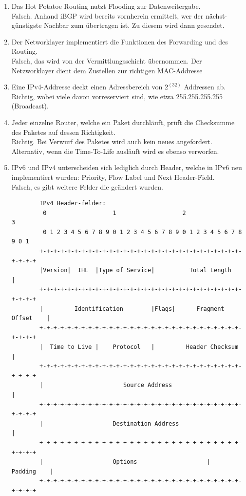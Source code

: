 \documentclass{scrartcl}
\begin{document}
\begin{enumerate}
        \item Das Hot Potatoe Routing nutzt Flooding zur Datenweitergabe.\\
        Falsch. Anhand iBGP wird bereits vornherein ermittelt, wer der nächst-günstigste Nachbar zum übertragen ist. Zu diesem wird dann gesendet.
        
        \item Der Networklayer implementiert die Funktionen des Forwarding und des Routing.\\
        Falsch, das wird von der Vermittlungsschicht übernommen. Der Netzworklayer dient dem Zustellen zur richtigen MAC-Addresse
        
        
        \item Eine IPv4-Addresse deckt einen Adressbereich von $2^(32)$ Addressen ab.\\
        Richtig, wobei viele davon vorreserviert sind, wie etwa 255.255.255.255 (Broadcast). 
        
        \item Jeder einzelne Router, welche ein Paket durchläuft, prüft die Checksumme des Paketes auf dessen Richtigkeit.\\
        Richtig. Bei Verwurf des Paketes wird auch kein neues angefordert.
        Alternativ, wenn die Time-To-Life ausläuft wird es ebenso verworfen.
        
        \item IPv6 und IPv4 unterscheiden sich lediglich durch Header, welche in IPv6 neu implementiert wurden: Priority, Flow Label und Next Header-Field.\\
        Falsch, es gibt weitere Felder die geändert wurden.
        
        \begin{verbatim}
        IPv4 Header-felder:
         0                   1                   2                   3
         0 1 2 3 4 5 6 7 8 9 0 1 2 3 4 5 6 7 8 9 0 1 2 3 4 5 6 7 8 9 0 1
        +-+-+-+-+-+-+-+-+-+-+-+-+-+-+-+-+-+-+-+-+-+-+-+-+-+-+-+-+-+-+-+-+
        |Version|  IHL  |Type of Service|          Total Length         |
        +-+-+-+-+-+-+-+-+-+-+-+-+-+-+-+-+-+-+-+-+-+-+-+-+-+-+-+-+-+-+-+-+
        |         Identification        |Flags|      Fragment Offset    |
        +-+-+-+-+-+-+-+-+-+-+-+-+-+-+-+-+-+-+-+-+-+-+-+-+-+-+-+-+-+-+-+-+
        |  Time to Live |    Protocol   |         Header Checksum       |
        +-+-+-+-+-+-+-+-+-+-+-+-+-+-+-+-+-+-+-+-+-+-+-+-+-+-+-+-+-+-+-+-+
        |                       Source Address                          |
        +-+-+-+-+-+-+-+-+-+-+-+-+-+-+-+-+-+-+-+-+-+-+-+-+-+-+-+-+-+-+-+-+
        |                    Destination Address                        |
        +-+-+-+-+-+-+-+-+-+-+-+-+-+-+-+-+-+-+-+-+-+-+-+-+-+-+-+-+-+-+-+-+
        |                    Options                    |    Padding    |
        +-+-+-+-+-+-+-+-+-+-+-+-+-+-+-+-+-+-+-+-+-+-+-+-+-+-+-+-+-+-+-+-+
        \end{verbatim}
        

\end{enumerate}
\end{document}
